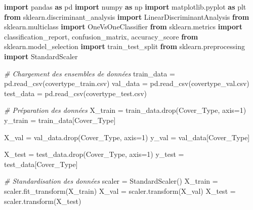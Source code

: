 \documentclass[
  letterpaper,
  DIV=11,
  numbers=noendperiod]{scrartcl}
\newenvironment{Shaded}{}{}
\newcommand{\CommentTok}[1]{\textcolor[rgb]{0.38,0.63,0.69}{\textit{#1}}}
\newcommand{\DecValTok}[1]{\textcolor[rgb]{0.25,0.63,0.44}{#1}}
\newcommand{\ImportTok}[1]{\textcolor[rgb]{0.00,0.50,0.00}{\textbf{#1}}}
\newcommand{\NormalTok}[1]{#1}
\newcommand{\OperatorTok}[1]{\textcolor[rgb]{0.40,0.40,0.40}{#1}}
\newcommand{\StringTok}[1]{\textcolor[rgb]{0.25,0.44,0.63}{#1}}
\begin{document}
\begin{Shaded}
\begin{Highlighting}[]
\ImportTok{import}\NormalTok{ pandas }\ImportTok{as}\NormalTok{ pd}
\ImportTok{import}\NormalTok{ numpy }\ImportTok{as}\NormalTok{ np}
\ImportTok{import}\NormalTok{ matplotlib.pyplot }\ImportTok{as}\NormalTok{ plt}
\ImportTok{from}\NormalTok{ sklearn.discriminant\_analysis }\ImportTok{import}\NormalTok{ LinearDiscriminantAnalysis}
\ImportTok{from}\NormalTok{ sklearn.multiclass }\ImportTok{import}\NormalTok{ OneVsOneClassifier}
\ImportTok{from}\NormalTok{ sklearn.metrics }\ImportTok{import}\NormalTok{ classification\_report, confusion\_matrix, accuracy\_score}
\ImportTok{from}\NormalTok{ sklearn.model\_selection }\ImportTok{import}\NormalTok{ train\_test\_split}
\ImportTok{from}\NormalTok{ sklearn.preprocessing }\ImportTok{import}\NormalTok{ StandardScaler}

\CommentTok{\# Chargement des ensembles de données}
\NormalTok{train\_data }\OperatorTok{=}\NormalTok{ pd.read\_csv(}\StringTok{\textquotesingle{}covertype\_train.csv\textquotesingle{}}\NormalTok{)}
\NormalTok{val\_data }\OperatorTok{=}\NormalTok{ pd.read\_csv(}\StringTok{\textquotesingle{}covertype\_val.csv\textquotesingle{}}\NormalTok{)}
\NormalTok{test\_data }\OperatorTok{=}\NormalTok{ pd.read\_csv(}\StringTok{\textquotesingle{}covertype\_test.csv\textquotesingle{}}\NormalTok{)}

\CommentTok{\# Préparation des données}
\NormalTok{X\_train }\OperatorTok{=}\NormalTok{ train\_data.drop(}\StringTok{\textquotesingle{}Cover\_Type\textquotesingle{}}\NormalTok{, axis}\OperatorTok{=}\DecValTok{1}\NormalTok{)}
\NormalTok{y\_train }\OperatorTok{=}\NormalTok{ train\_data[}\StringTok{\textquotesingle{}Cover\_Type\textquotesingle{}}\NormalTok{]}

\NormalTok{X\_val }\OperatorTok{=}\NormalTok{ val\_data.drop(}\StringTok{\textquotesingle{}Cover\_Type\textquotesingle{}}\NormalTok{, axis}\OperatorTok{=}\DecValTok{1}\NormalTok{)}
\NormalTok{y\_val }\OperatorTok{=}\NormalTok{ val\_data[}\StringTok{\textquotesingle{}Cover\_Type\textquotesingle{}}\NormalTok{]}

\NormalTok{X\_test }\OperatorTok{=}\NormalTok{ test\_data.drop(}\StringTok{\textquotesingle{}Cover\_Type\textquotesingle{}}\NormalTok{, axis}\OperatorTok{=}\DecValTok{1}\NormalTok{)}
\NormalTok{y\_test }\OperatorTok{=}\NormalTok{ test\_data[}\StringTok{\textquotesingle{}Cover\_Type\textquotesingle{}}\NormalTok{]}

\CommentTok{\# Standardisation des données}
\NormalTok{scaler }\OperatorTok{=}\NormalTok{ StandardScaler()}
\NormalTok{X\_train }\OperatorTok{=}\NormalTok{ scaler.fit\_transform(X\_train)}
\NormalTok{X\_val }\OperatorTok{=}\NormalTok{ scaler.transform(X\_val)}
\NormalTok{X\_test }\OperatorTok{=}\NormalTok{ scaler.transform(X\_test)}


\end{Highlighting}
\end{Shaded}
\end{document}

